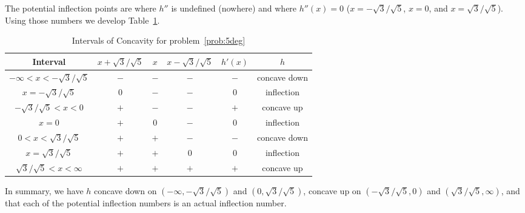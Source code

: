 \documentclass{article}
\begin{document}
\begin{enumerate}
\begin{enumerate}
    The potential inflection points are where $h''$ is undefined
    (nowhere) and where $h''(x)=0$ ($x=-\sqrt{3}/\sqrt{5}$, $x=0$, and
    $x=\sqrt{3}/\sqrt{5}$).  Using those numbers we develop
    Table~\ref{tab:5degfpp}.
    \begin{table}[htbp]
      \centering
      \begin{tabular}{|c|c|c|c|c|c|}
        \hline
        Interval                       & $x+\sqrt{3}/\sqrt{5}$ & $x$     & $x-\sqrt{3}/\sqrt{5}$ & $h'(x)$ & $h$
        \\
        \hline\hline
        $-\infty<x<-\sqrt{3}/\sqrt{5}$ & $-$                   & $-$     & $-$                   & $-$     & concave down
        \\
        \hline
        $x=-\sqrt{3}/\sqrt{5}$         & $0$                   & $-$     & $-$                   & $0$     & inflection
        \\
        \hline
        $-\sqrt{3}/\sqrt{5}<x<0$       & $+$                   & $-$     & $-$                   & $+$     & concave up
        \\
        \hline
        $x=0$                          & $+$                   & $0$     & $-$                   & $0$     & inflection
        \\
        \hline
        $0<x<\sqrt{3}/\sqrt{5}$        & $+$                   & $+$     & $-$                   & $-$     & concave down
        \\
        \hline
        $x=\sqrt{3}/\sqrt{5}$          & $+$                   & $+$     & $0$                   & $0$     & inflection
        \\
        \hline
        $\sqrt{3}/\sqrt{5}<x<\infty$   & $+$                   & $+$     & $+$                   & $+$     & concave up
        \\
        \hline
      \end{tabular}
      \caption{Intervals of Concavity for problem~\ref{prob:5deg}}
      \label{tab:5degfpp}
    \end{table}
    In summary, we have $h$ concave down on
    $(-\infty,-\sqrt{3}/\sqrt{5})$ and $(0,\sqrt{3}/\sqrt{5})$,
    concave up on $(-\sqrt{3}/\sqrt{5},0)$ and
    $(\sqrt{3}/\sqrt{5},\infty)$, and that each of the potential
    inflection numbers is an actual inflection number.


\end{enumerate}
\end{enumerate}
\end{document}
